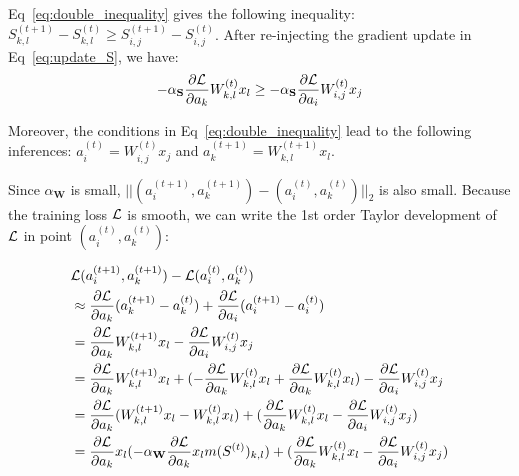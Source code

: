 \documentclass{article}
\begin{document}
Eq~\eqref{eq:double_inequality} gives the following inequality: $S^{(t+1)}_{k,l} - S^{(t)}_{k,l} \geq S^{(t+1)}_{i,j} - S^{(t)}_{i,j}$. After re-injecting the gradient update in Eq~\eqref{eq:update_S}, we have:
\begin{equation}
\label{eq:inequality}
-\alpha_{\mathbf{S}} \frac{\partial {\cal L}}{\partial a_k} W^{(t)}_{k,l} x_l \geq -\alpha_{\mathbf{S}} \frac{\partial {\cal L}}{\partial a_i} W^{(t)}_{i,j} x_j
\end{equation}

Moreover, the conditions in Eq~\eqref{eq:double_inequality} lead to the following inferences: $a^{(t)}_i = W^{(t)}_{i,j} x_j$ and $a^{(t+1)}_k = W^{(t+1)}_{k,l} x_l$.

Since $\alpha_{\mathbf{W}}$ is small, $||(a^{(t+1)}_i, a^{(t+1)}_k) - (a^{(t)}_i, a^{(t)}_k)||_{2}$ is also small. Because the training loss $\cal L$ is smooth, we can write the 1st order Taylor development of $\cal{L}$ in point $(a^{(t)}_i, a^{(t)}_k)$:

\begin{equation}
\label{eq:taylor}
    \begin{split}
        & \mathcal{L}(a^{(t+1)}_i, a^{(t+1)}_k) - \mathcal{L}(a^{(t)}_i, a^{(t)}_k) \\
        & \approx \frac{\partial {\cal L}}{\partial a_k} (a^{(t+1)}_k - a^{(t)}_k) + \frac{\partial {\cal L}}{\partial a_i} (a^{(t+1)}_i - a^{(t)}_i)\\
        & = \frac{\partial {\cal L}}{\partial a_k} W^{(t+1)}_{k,l} x_l - \frac{\partial {\cal L}}{\partial a_i} W^{(t)}_{i,j} x_j \\
        & = \frac{\partial {\cal L}}{\partial a_k} W^{(t+1)}_{k,l} x_l + (- \frac{\partial {\cal L}}{\partial a_k} W^{(t)}_{k,l} x_l + \frac{\partial {\cal L}}{\partial a_k} W^{(t)}_{k,l} x_l) - \frac{\partial {\cal L}}{\partial a_i} W^{(t)}_{i,j} x_j \\
        & = \frac{\partial {\cal L}}{\partial a_k} (W^{(t+1)}_{k,l} x_l - W^{(t)}_{k,l} x_l) + (\frac{\partial {\cal L}}{\partial a_k} W^{(t)}_{k,l} x_l - \frac{\partial {\cal L}}{\partial a_i} W^{(t)}_{i,j} x_j) \\
        & = \frac{\partial {\cal L}}{\partial a_k} x_l (-\alpha_{\mathbf{W}} \frac{\partial {\cal L}}{\partial a_k} x_l m(S^{(t)})_{k,l}) + (\frac{\partial {\cal L}}{\partial a_k} W^{(t)}_{k,l} x_l - \frac{\partial {\cal L}}{\partial a_i} W^{(t)}_{i,j} x_j)
    \end{split}
\end{equation}
\end{document}
